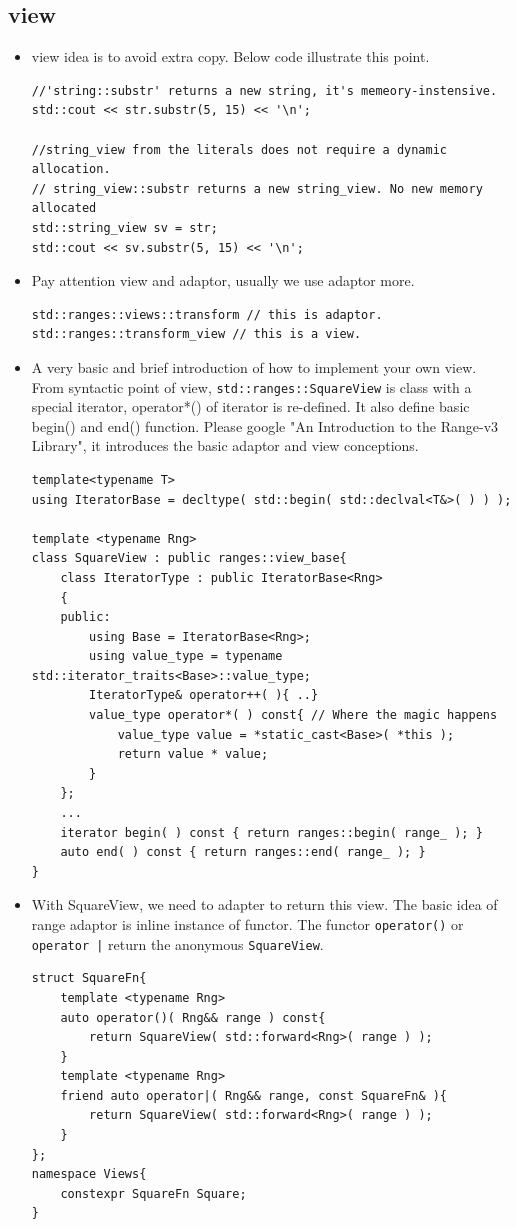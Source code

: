 \documentclass[a4paper,11pt,twoside]{book}
\begin{document}
\subsection{view}
\begin{itemize}
	\item view idea is to avoid extra copy. Below code illustrate this point. 
\begin{lstlisting}
//'string::substr' returns a new string, it's memeory-instensive.
std::cout << str.substr(5, 15) << '\n';

//string_view from the literals does not require a dynamic allocation.
// string_view::substr returns a new string_view. No new memory allocated
std::string_view sv = str;
std::cout << sv.substr(5, 15) << '\n';	
\end{lstlisting}

\item Pay attention view and adaptor, usually we use adaptor more.
\begin{lstlisting}
std::ranges::views::transform // this is adaptor.
std::ranges::transform_view // this is a view.
\end{lstlisting}
	

	\item  A very basic and brief introduction of how to implement your own view. From syntactic point of view,  \texttt{std::ranges::SquareView} is class with a special iterator, operator*() of iterator is re-defined. It also define basic begin() and end() function. Please google "An Introduction to the Range-v3 Library", it introduces the basic adaptor and view conceptions.
\begin{lstlisting}
template<typename T>
using IteratorBase = decltype( std::begin( std::declval<T&>( ) ) );

template <typename Rng>
class SquareView : public ranges::view_base{
	class IteratorType : public IteratorBase<Rng>
	{
	public:
		using Base = IteratorBase<Rng>;
		using value_type = typename std::iterator_traits<Base>::value_type;
		IteratorType& operator++( ){ ..}
		value_type operator*( ) const{ // Where the magic happens
			value_type value = *static_cast<Base>( *this );
			return value * value;
		}
	};
	...
	iterator begin( ) const { return ranges::begin( range_ ); }	
	auto end( ) const { return ranges::end( range_ ); }
}
\end{lstlisting}

	\item With SquareView, we need to adapter to return this view. The basic idea of range adaptor is inline instance of functor. The functor \texttt{operator()} or \texttt{operator |} return the anonymous \texttt{SquareView}. 
\begin{lstlisting}
struct SquareFn{
	template <typename Rng>
	auto operator()( Rng&& range ) const{
		return SquareView( std::forward<Rng>( range ) );
	}	
	template <typename Rng>
	friend auto operator|( Rng&& range, const SquareFn& ){
		return SquareView( std::forward<Rng>( range ) );
	}
};
namespace Views{
	constexpr SquareFn Square;
}


\end{lstlisting}
\end{itemize}
\end{document}
